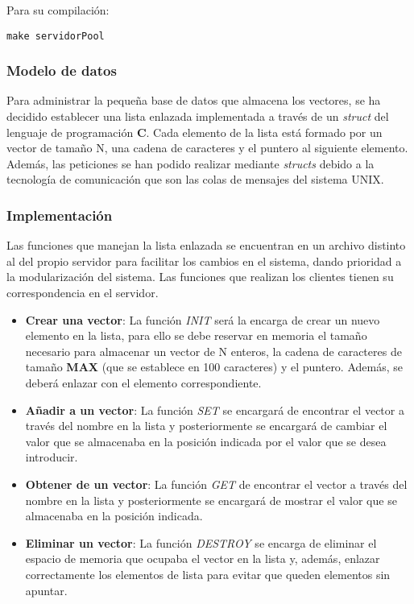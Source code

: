 \documentclass[10pt, spanish, pdftex]{template/UC3M_document}
\begin{document}
Para su compilación:
  \begin{lstlisting}[frame=single]
    make servidorPool
  \end{lstlisting}


\subsubsection{Modelo de datos}
Para administrar la pequeña base de datos que almacena los vectores, se ha decidido establecer una lista enlazada implementada a través de un \textit{struct} del lenguaje de programación \textbf{C}. Cada elemento de la lista está formado por un vector de tamaño N, una cadena de caracteres y el puntero al siguiente elemento.
Además, las peticiones se han podido realizar mediante \textit{structs} debido a la tecnología de comunicación que son las colas de mensajes del sistema UNIX.

\subsubsection{Implementación}
Las funciones que manejan la lista enlazada se encuentran en un archivo distinto al del propio servidor para facilitar los cambios en el sistema, dando prioridad a la modularización del sistema. Las funciones que realizan los clientes tienen su correspondencia en el servidor.
\begin{itemize}
    \item \textbf{Crear una vector}: La función \textit{INIT} será la encarga de crear un nuevo elemento en la lista, para ello se debe reservar en memoria el tamaño necesario para almacenar un vector de N enteros, la cadena de caracteres de tamaño \textbf{MAX} (que se establece en 100 caracteres) y el puntero. Además, se deberá enlazar con el elemento correspondiente.
    \item \textbf{Añadir a un vector}: La función \textit{SET} se encargará de encontrar el vector a través del nombre en la lista y posteriormente se encargará de cambiar el valor que se almacenaba en la posición indicada por el valor que se desea introducir.
    \item \textbf{Obtener de un vector}: La función \textit{GET} de encontrar el vector a través del nombre en la lista y posteriormente se encargará de mostrar el valor que se almacenaba en la posición indicada.
    \item \textbf{Eliminar un vector}: La función \textit{DESTROY} se encarga de eliminar el espacio de memoria que ocupaba el vector en la lista y, además, enlazar correctamente los elementos de lista para evitar que queden elementos sin apuntar.
\end{itemize}
\end{document}
